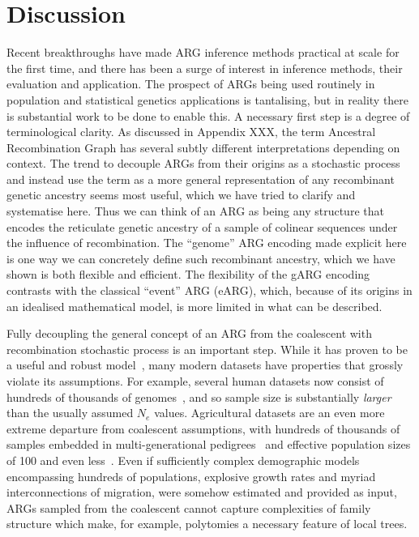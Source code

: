 \documentclass{article}
\begin{document}
\section*{Discussion}
Recent breakthroughs have made ARG inference methods practical
at scale for the first time, and there has been a surge of interest
in inference methods, their evaluation and application.
The prospect of ARGs being used routinely in population
and statistical genetics applications is tantalising,
but in reality there is  substantial work to be done to
enable this.
A necessary first step is a degree of  terminological clarity.
As discussed in Appendix XXX, the term Ancestral Recombination
Graph has several
subtly different interpretations depending on context.
The trend to decouple ARGs from their origins as a stochastic
process and instead use the term as a more general representation of any
recombinant genetic ancestry seems most useful, which we have
tried to clarify and systematise here. Thus
we can think of an ARG as being any structure that encodes the
reticulate genetic ancestry of a sample of colinear sequences under
the influence of recombination. The ``genome'' ARG encoding
made explicit here is one way we can concretely
define such recombinant ancestry, which we have shown is both
flexible and efficient.
The flexibility of the gARG encoding contrasts with the classical
``event'' ARG (eARG), which, because of its origins in an idealised
mathematical model, is more limited in what can be described.

Fully decoupling the general concept of an ARG from the coalescent
with recombination stochastic process is an important step.
While it has proven to be a useful and
robust
model~\citep{wakeley2012gene,bhaskar2014distortion,nelson2020accounting},
many modern datasets have properties that grossly
violate its assumptions.
For example, several human datasets now consist of hundreds of thousands of
genomes~\citep{bycroft2018genome,karczewski2020mutational,tanjo2021practical},
and so sample size is substantially \emph{larger} than the
usually assumed $N_e$ values.
Agricultural datasets are an even more extreme departure from coalescent
assumptions, with hundreds of thousands of samples embedded in
multi-generational pedigrees~\citep{hayes20191000,Ros-Freixedes2020}
and effective population sizes of 100 and even
less~\citep{MacLeod2013,Makanjuola2020,Hall2016,Porcnic2016}.
Even if sufficiently complex demographic models~\citep{gower2022demes}
encompassing hundreds of populations, explosive growth rates and
myriad interconnections of migration, were somehow estimated and
provided as input, ARGs sampled from
the coalescent cannot capture complexities of family structure which
make, for example, polytomies a necessary feature of local trees.
\end{document}
